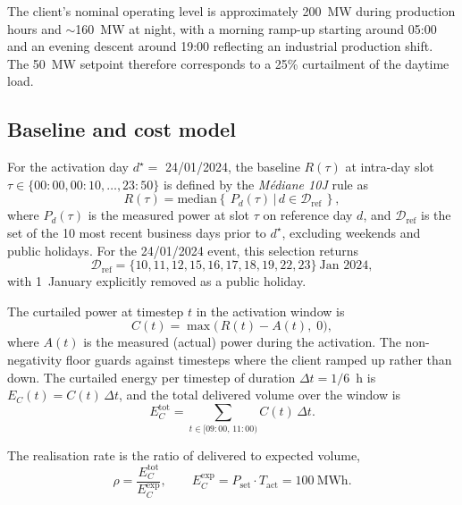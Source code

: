 \documentclass{article}
\begin{document}
The client's nominal operating level is approximately 200~MW during production hours and $\sim$160~MW at night, with a morning ramp-up starting around 05:00 and an evening descent around 19:00 reflecting an industrial production shift. The 50~MW setpoint therefore corresponds to a 25\% curtailment of the daytime load.

\subsection{Baseline and cost model}
\label{sec:model}

For the activation day $d^\star = $ 24/01/2024, the baseline $R(\tau)$ at intra-day slot $\tau \in \{00{:}00, 00{:}10, \dots, 23{:}50\}$ is defined by the \textit{M\'ediane 10J} rule as
\begin{equation}
R(\tau) = \mathrm{median}\!\left\{\, P_d(\tau) \,\big|\, d \in \mathcal{D}_{\text{ref}} \,\right\},
\label{eq:mediane}
\end{equation}
where $P_d(\tau)$ is the measured power at slot $\tau$ on reference day $d$, and $\mathcal{D}_{\text{ref}}$ is the set of the 10 most recent business days prior to $d^\star$, excluding weekends and public holidays. For the 24/01/2024 event, this selection returns
\[
\mathcal{D}_{\text{ref}} = \{10, 11, 12, 15, 16, 17, 18, 19, 22, 23\}~\text{Jan 2024},
\]
with 1~January explicitly removed as a public holiday.

The curtailed power at timestep $t$ in the activation window is
\begin{equation}
C(t) = \max\!\bigl(\,R(t) - A(t),\; 0\bigr),
\label{eq:curtailed}
\end{equation}
where $A(t)$ is the measured (actual) power during the activation. The non-negativity floor guards against timesteps where the client ramped up rather than down. The curtailed energy per timestep of duration $\Delta t = 1/6$~h is $E_C(t) = C(t)\,\Delta t$, and the total delivered volume over the window is
\begin{equation}
E_C^{\text{tot}} = \sum_{t \in [09{:}00,\,11{:}00)} C(t)\,\Delta t.
\label{eq:total}
\end{equation}

The realisation rate is the ratio of delivered to expected volume,
\begin{equation}
\rho = \frac{E_C^{\text{tot}}}{E_C^{\text{exp}}},
\qquad E_C^{\text{exp}} = P_{\text{set}}\cdot T_{\text{act}} = 100~\text{MWh}.
\label{eq:rho}
\end{equation}
\end{document}
